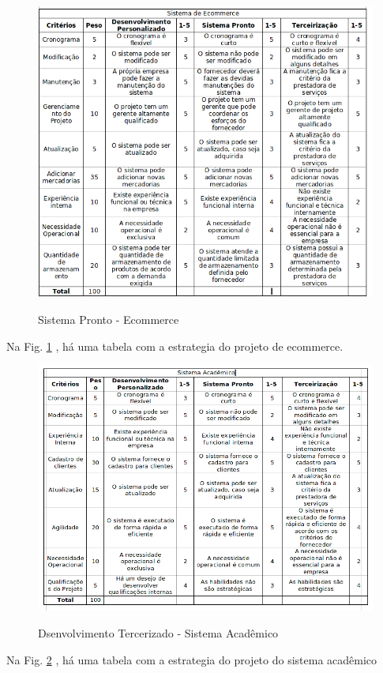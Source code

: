                 
                 \begin{figure}[H]
                 \caption{Sistema Pronto - Ecommerce}
               \centering %
                \includegraphics[width=15cm]{analisedeProjeto/tabela2} %
                \label{figura:tabela2}
                \end{figure}
                Na Fig. \ref{figura:tabela2} , há uma tabela com a estrategia do projeto de ecommerce.
                
                 \begin{figure}[H]
                 \caption{Dsenvolvimento Tercerizado - Sistema Acadêmico}
               \centering %
                \includegraphics[width=15cm]{analisedeProjeto/tabela1} %
                \label{figura:tabela1}
                \end{figure}
                Na Fig. \ref{figura:tabela1} , há uma tabela com a estrategia do projeto do sistema acadêmico
 
